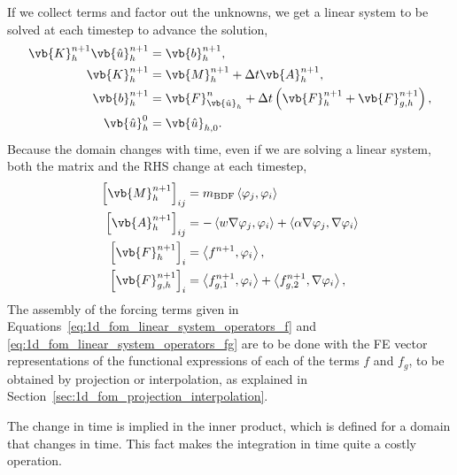 \documentclass[../../main.tex]{subfiles}
\newcommand{\inner}[2]{\left<#1, #2\right>}
\begin{document}
If we collect terms and factor out the unknowns, we get a linear system to be solved at each timestep to advance the solution,
\begin{subequations}
    \begin{align}
        \label{eq:1d_fom_linear_system_timestep}
        \vb{K}_h^{n+1} \vb{\hat{u}}_h^{n+1} &= \vb{b}_h^{n+1}, \\
        \vb{K}_h^{n+1} &= \vb{M}_{h}^{n+1} + \Delta t \vb{A}_{h}^{n+1}, \\
        \vb{b}_h^{n+1} &= \vb{F}_{\vb{\hat{u}}_h}^{n} + \Delta t \left(\vb{F}_h^{n+1} + \vb{F}_{g,h}^{n+1}\right), \\
        \vb{\hat{u}}_h^{0} &= \vb{\hat{u}}_{h,0}.
    \end{align}
\end{subequations}
Because the domain changes with time, even if we are solving a linear system, both the matrix and the RHS change at each timestep,
\begin{subequations}
    \label{eq:1d_fom_linear_system_operators}
    \begin{align}
        \left[\vb{M}_{h}^{n+1}\right]_{ij} &= m_{\text{BDF}} \inner{\varphi_j}{\varphi_i}  \\
        \left[\vb{A}_{h}^{n+1}\right]_{ij} &= -\inner{w \grad \varphi_j}{\varphi_i} + \inner{\alpha \grad \varphi_j}{\grad \varphi_i} \\
        \left[\vb{F}_{h}^{n+1}\right]_{i} &= \inner{f^{n+1}}{\varphi_i}, \label{eq:1d_fom_linear_system_operators_f} \\
        \left[\vb{F}_{{g,h}}^{n+1}\right]_{i} &= \inner{f_{g,1}^{n+1}}{\varphi_i} + \inner{f_{g,2}^{n+1}}{\grad \varphi_i}, \label{eq:1d_fom_linear_system_operators_fg}
    \end{align}
\end{subequations}
The assembly of the forcing terms given in Equations~\eqref{eq:1d_fom_linear_system_operators_f} and \eqref{eq:1d_fom_linear_system_operators_fg}
are to be done with the FE vector representations of the functional expressions of each of the terms $f$ and $f_g$, to be obtained by projection or interpolation, as explained in Section~\ref{sec:1d_fom_projection_interpolation}.

The change in time is implied in the inner product, which is defined for a domain that changes in time. 
This fact makes the integration in time quite a costly operation.
\end{document}
